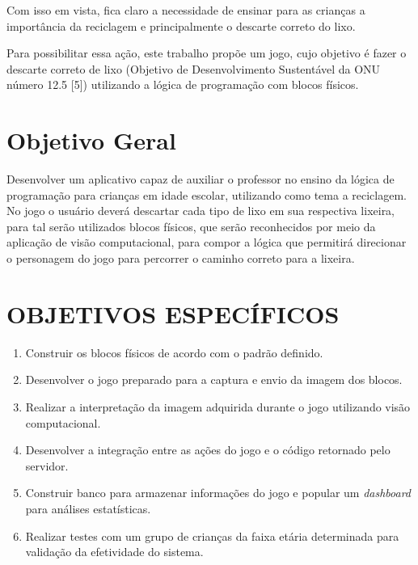 Com isso em vista, fica claro a necessidade de ensinar para as crianças a importância da reciclagem e principalmente o descarte correto do lixo.

Para possibilitar essa ação, este trabalho propõe um jogo, cujo objetivo é fazer o descarte correto de lixo (Objetivo de Desenvolvimento Sustentável da ONU número 12.5 [5]) utilizando a lógica de programação com blocos físicos.

\section{Objetivo Geral}


Desenvolver um aplicativo capaz de auxiliar o professor no ensino da lógica de programação para crianças em idade escolar, utilizando como tema a reciclagem. No jogo o usuário deverá descartar cada tipo de lixo em sua respectiva lixeira, para tal serão utilizados blocos físicos, que serão reconhecidos por meio da aplicação de visão computacional, para compor a lógica que permitirá direcionar o personagem do jogo para percorrer o caminho correto para a lixeira.

\section{OBJETIVOS ESPECÍFICOS}

\begin{enumerate}
\item Construir os blocos físicos de acordo com o padrão definido.
\item Desenvolver o jogo preparado para a captura e envio da imagem dos blocos.
\item Realizar a interpretação da imagem adquirida durante o jogo utilizando visão computacional.
\item Desenvolver a integração entre as ações do jogo e o código retornado pelo servidor.
\item Construir banco para armazenar informações do jogo e popular um \textit{dashboard} para análises estatísticas.
\item Realizar testes com um grupo de crianças da faixa etária determinada para validação da efetividade do sistema.
\end{enumerate}
